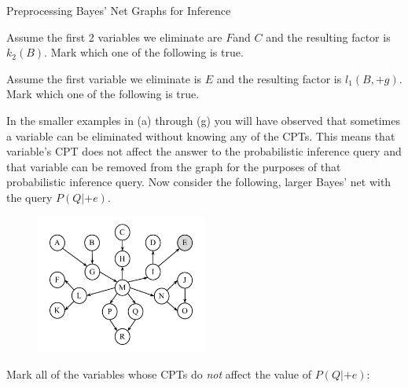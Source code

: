 \begin{problem}[]{Preprocessing Bayes' Net Graphs for Inference}
\begin{question}[2]
Assume the first 2 variables we eliminate are $F$and $C$ and the resulting factor is $k_2(B)$. Mark which one of the following is true.
\begin{multicols}{3}
\begin{itemize}[label=, itemsep=12pt, topsep=12pt]
\TwoF
\end{itemize}
\end{multicols}
\end{question}

\begin{question}[2]
Assume the first variable we eliminate is $E$ and the resulting factor is $l_1(B,+g)$. Mark which one of the following is true.
\begin{multicols}{3}
\begin{itemize}[label=, itemsep=12pt, topsep=12pt]
\TwoG
\end{itemize}
\end{multicols}
\end{question}


\begin{question}[4]
In the smaller examples in (a) through (g) you will have observed that
sometimes a variable can be eliminated without knowing any of the CPTs.
This means that variable's CPT does not affect the answer to the
probabilistic inference query and that variable can be removed from the graph for
the purposes of that probabilistic inference query.  Now consider the following,
larger Bayes' net with the query $P(Q|+e)$.\\


\begin{figure}[4]
\centering
    \includegraphics[width=0.5\textwidth]{figures/FA12-MT2-Elimination3V3.pdf}
\end{figure}
Mark all of the variables whose CPTs do \textit{not} affect the value of $P(Q|+e)$:


\end{question}
\end{problem}

